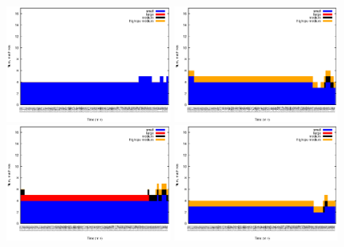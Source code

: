 \begin{figure}[htb]
	\begin{minipage}[b]{0.19\linewidth}
		\vspace{-3mm}
		\includegraphics[width=\linewidth,height=3.8cm]{images/exps2011/low/das/inst_type_machines.eps}	
	\end{minipage}
\begin{minipage}[b]{0.19\linewidth}
		\vspace{-3mm}
		\includegraphics[width=\linewidth,height=3.8cm]{images/exps2011/medium_down/das/inst_type_machines.eps}
	\end{minipage}
	\begin{minipage}[b]{0.19\linewidth}
		\vspace{-3mm}
		\includegraphics[width=\linewidth,height=3.8cm]{images/exps2011/medium/das/inst_type_machines.eps}
	\end{minipage}
	\begin{minipage}[b]{0.19\linewidth}
		\vspace{-3mm}
		\includegraphics[width=\linewidth,height=3.8cm]{images/exps2011/medium_up/das/inst_type_machines.eps}

\end{minipage}
\end{figure}
